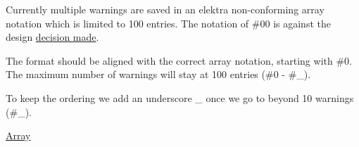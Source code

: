 Currently multiple warnings are saved in an elektra non-\/conforming array notation which is limited to 100 entries. The notation of {\ttfamily \#00} is against the design \hyperlink{doc_decisions_array_md}{decision made}.

The format should be aligned with the correct array notation, starting with {\ttfamily \#0}. The maximum number of warnings will stay at 100 entries ({\ttfamily \#0} -\/ {\ttfamily \#\+\_}).

To keep the ordering we add an underscore {\ttfamily \+\_\+} once we go to beyond 10 warnings ({\ttfamily \#\+\_}).


\begin{DoxyItemize}
\item \hyperlink{doc_decisions_array_md}{Array}
\end{DoxyItemize}